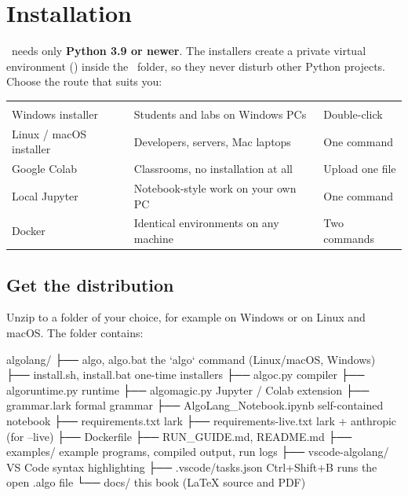 \chapter{Installation}
\label{ch:install}

\algolang\ needs only \textbf{Python 3.9 or newer}. The installers create a private virtual environment () inside the \algolang\ folder, so they never disturb other Python projects. Choose the route that suits you:

\begin{center}
\small
\begin{tabularx}{\linewidth}{@{}L{3.4cm}YL{3.3cm}@{}}
\toprule
{} &  & \\
\goldrule
Windows installer & Students and labs on Windows PCs & Double-click\\
Linux / macOS installer & Developers, servers, Mac laptops & One command\\
Google Colab & Classrooms, no installation at all & Upload one file\\
Local Jupyter & Notebook-style work on your own PC & One command\\
Docker & Identical environments on any machine & Two commands\\
\bottomrule
\end{tabularx}
\end{center}

\section{Get the distribution}

Unzip  to a folder of your choice, for example  on Windows or  on Linux and macOS. The folder contains:

\begin{plaincode}[title=distribution layout]
algolang/
├── algo, algo.bat              the `algo` command (Linux/macOS, Windows)
├── install.sh, install.bat     one-time installers
├── algoc.py                    compiler
├── algoruntime.py              runtime
├── algomagic.py                Jupyter / Colab extension
├── grammar.lark                formal grammar
├── AlgoLang_Notebook.ipynb     self-contained notebook
├── requirements.txt            lark
├── requirements-live.txt       lark + anthropic (for --live)
├── Dockerfile
├── RUN_GUIDE.md, README.md
├── examples/                   example programs, compiled output, run logs
├── vscode-algolang/            VS Code syntax highlighting
├── .vscode/tasks.json          Ctrl+Shift+B runs the open .algo file
└── docs/                       this book (LaTeX source and PDF)
\end{plaincode}


